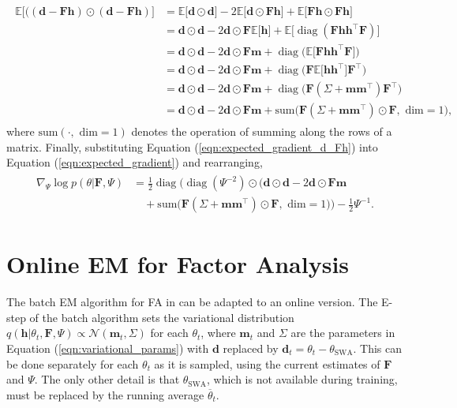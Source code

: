 \documentclass[msc,deptreport.inf]{infthesis} %
\newcommand{\matr}[1]{\mathbf{#1}}
\newcommand{\E}{\mathbb E}
\newcommand{\diag}{\mathop{\mathrm{diag}}}
\begin{document}
\begin{align}\label{eqn:expected_gradient_d_Fh}
\begin{split}
	\E \big[\big((\matr{d} - \matr{Fh}) \odot (\matr{d} - \matr{Fh})\big] 
	& = \E \big[\matr{d} \odot \matr{d} \big] - 2\E \big[ \matr{d} \odot \matr{Fh} \big] + \E \big[ \matr{Fh} \odot \matr{Fh} \big] \\
	& = \matr{d} \odot \matr{d} - 2\matr{d} \odot \matr{F} \E \big[ \matr{h} \big] + \E \big[ \diag(\matr{Fhh^\intercal F}) \big] \\
	& = \matr{d} \odot \matr{d} - 2\matr{d} \odot \matr{F} \matr{m} + \diag\big(\E \big[ \matr{Fhh^\intercal F} \big]\big) \\
	& = \matr{d} \odot \matr{d} - 2\matr{d} \odot \matr{F} \matr{m} + \diag\big( \matr{F} \E \big[ \matr{hh^\intercal} \big] \matr{F}^\intercal \big) \\
	& = \matr{d} \odot \matr{d} - 2\matr{d} \odot \matr{F} \matr{m} + \diag\big( \matr{F} (\Sigma + \matr{m} \matr{m}^\intercal) \matr{F}^\intercal \big) \\
	& = \matr{d} \odot \matr{d} - 2\matr{d} \odot \matr{F} \matr{m} + \text{sum}\big(\matr{F} (\Sigma + \matr{m} \matr{m}^\intercal) \odot \matr{F}, \text{ dim} = 1\big),
\end{split}
\end{align} 
where $\text{sum}(\cdot, \text{ dim} = 1)$ denotes the operation of summing along the rows of a matrix. Finally, substituting Equation (\ref{eqn:expected_gradient_d_Fh}) into Equation (\ref{eqn:expected_gradient}) and rearranging, 
\begin{align}
\begin{split}
	\nabla_{\Psi} \log p(\theta | \matr{F}, \Psi) 
	& = \frac{1}{2} \diag\Big(\diag(\Psi^{-2}) \odot \big(\matr{d} \odot \matr{d} - 2\matr{d} \odot \matr{F} \matr{m} \\
	& \quad + \text{sum}\big(\matr{F} (\Sigma + \matr{m} \matr{m}^\intercal) \odot \matr{F}, \text{ dim} = 1\big) \Big)
	 - \frac{1}{2} \Psi^{-1}.
\end{split}
\end{align} 


\section{Online EM for Factor Analysis}\label{sec:online_em}

The batch EM algorithm for FA in \cite{barber2007} can be adapted to an online version. The E-step of the batch algorithm sets the variational distribution $q(\matr{h} | \theta_t, \matr{F}, \Psi) \propto \mathcal{N}(\matr{m}_t, \Sigma)$ for each $\theta_t$, where $\matr{m}_t$ and $\Sigma$ are the parameters in Equation (\ref{eqn:variational_params}) with $\matr{d}$ replaced by $\matr{d}_t = \theta_t - \theta_{\text{SWA}}$. This can be done separately for each $\theta_t$ as it is sampled, using the current estimates of $\matr{F}$ and $\Psi$. The only other detail is that $\theta_{\text{SWA}}$, which is not available during training, must be replaced by the running average $\overline{\theta}_t$.
\end{document}
